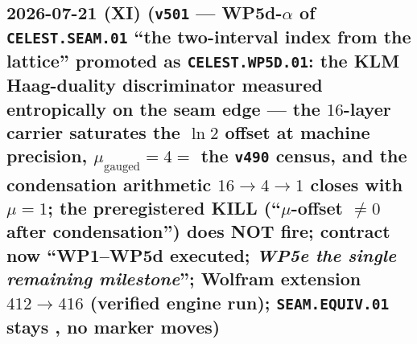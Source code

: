 \subsection*{2026-07-21 (XI) (\texttt{v501} --- WP5d-$\alpha$ of \texttt{CELEST.SEAM.01} ``the two-interval index from the lattice'' promoted as \texttt{CELEST.WP5D.01}: the KLM Haag-duality discriminator measured entropically on the seam edge --- the $16$-layer carrier saturates the $\ln2$ offset at machine precision, $\mu_{\mathrm{gauged}}=4=$ the \texttt{v490} census, and the condensation arithmetic $16\to4\to1$ closes with $\mu=1$; the preregistered KILL (``$\mu$-offset $\neq0$ after condensation'') does NOT fire; contract now ``WP1--WP5d executed; \emph{WP5e the single remaining milestone}''; Wolfram extension $412\to416$ (verified engine run); \texttt{SEAM.EQUIV.01} stays \mO, no marker moves)}
